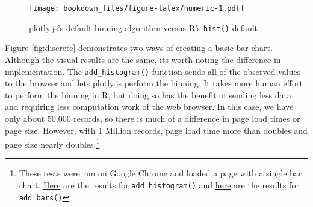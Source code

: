 \documentclass[12pt,]{isuthesis}
\newenvironment{Shaded}{\begin{snugshade}}{\end{snugshade}}
\newcommand{\KeywordTok}[1]{\textcolor[rgb]{0.13,0.29,0.53}{\textbf{{#1}}}}
\newcommand{\DataTypeTok}[1]{\textcolor[rgb]{0.13,0.29,0.53}{{#1}}}
\newcommand{\DecValTok}[1]{\textcolor[rgb]{0.00,0.00,0.81}{{#1}}}
\newcommand{\StringTok}[1]{\textcolor[rgb]{0.31,0.60,0.02}{{#1}}}
\newcommand{\OtherTok}[1]{\textcolor[rgb]{0.56,0.35,0.01}{{#1}}}
\newcommand{\NormalTok}[1]{{#1}}
\let\rmarkdownfootnote\footnote%
\def\footnote{\protect\rmarkdownfootnote}
\begin{document}
\begin{Shaded}
\end{Shaded}

\begin{figure}[htbp]
\centering
\texttt{[image: bookdown\_files/figure-latex/numeric-1.pdf]}
\caption{\label{fig:numeric}plotly.js's default binning algorithm versus R's
\texttt{hist()} default}
\end{figure}

Figure \ref{fig:discrete} demonstrates two ways of creating a basic bar
chart. Although the visual results are the same, its worth noting the
difference in implementation. The \texttt{add\_histogram()} function
sends all of the observed values to the browser and lets plotly.js
perform the binning. It takes more human effort to perform the binning
in R, but doing so has the benefit of sending less data, and requiring
less computation work of the web browser. In this case, we have only
about 50,000 records, so there is much of a difference in page load
times or page size. However, with 1 Million records, page load time more
than doubles and page size nearly doubles.\footnote{These tests were run
  on Google Chrome and loaded a page with a single bar chart.
  \href{https://www.webpagetest.org/result/160924_DP_JBX/}{Here} are the
  results for \texttt{add\_histogram()} and
  \href{https://www.webpagetest.org/result/160924_QG_JA1/}{here} are the
  results for \texttt{add\_bars()}}
\end{document}
